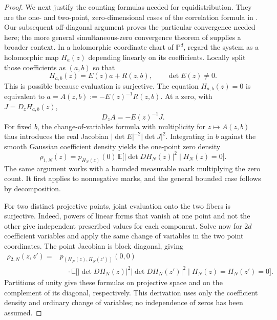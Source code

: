 \begin{proof}
We next justify the counting formulas needed for equidistribution.
They are the one- and two-point, zero-dimensional cases of the
correlation formula in \citet[Theorem~2.1]{BleherShiffmanZelditch2000}.
Our subsequent off-diagonal argument proves the particular convergence
needed here; the more general simultaneous-zero convergence theorem of
\citet[Corollary~1.3]{Shiffman2008Convergence} supplies a broader context.
In a holomorphic coordinate chart of $\mathbb P^d$, regard the system
as a holomorphic map $H_a(z)$ depending linearly on its coefficients.
Locally split those coefficients as $(a,b)$ so that
\[
 H_{a,b}(z)=E(z)a+R(z,b),\qquad \det E(z)\ne0.
\]
This is possible because evaluation is surjective.  The equation
$H_{a,b}(z)=0$ is equivalent to
$a=A(z,b):=-E(z)^{-1}R(z,b)$.  At a zero, with
$J=D_zH_{a,b}(z)$,
\[
 D_zA=-E(z)^{-1}J.
\]
For fixed $b$, the change-of-variables formula with multiplicity for
$z\mapsto A(z,b)$ thus introduces the real Jacobian
$|\det E|^{-2}|\det J|^2$.  Integrating in $b$ against the smooth
Gaussian coefficient density yields the one-point zero density
\begin{equation}
 \label{grid:one-point-density}
 \rho_{1,N}(z)=
 p_{H_N(z)}(0)\,
 \mathbb E\bigl[|\det DH_N(z)|^2\mid H_N(z)=0\bigr].
\end{equation}
The same argument works with a bounded measurable mark multiplying
the zero count.  It first applies to nonnegative marks, and the
general bounded case follows by decomposition.

For two distinct projective points, joint evaluation onto the two
fibers is surjective.  Indeed, powers of linear forms that vanish at
one point and not the other give independent prescribed values for
each component.  Solve now for $2d$ coefficient variables and apply
the same change of variables in the two point coordinates.  The
point Jacobian is block diagonal, giving
\begin{equation}
 \label{grid:two-point-density}
 \begin{split}
 \rho_{2,N}(z,z')={}&p_{(H_N(z),H_N(z'))}(0,0)\\
 &\quad\cdot
 \mathbb E\bigl[
   |\det DH_N(z)|^2|\det DH_N(z')|^2
       \mid H_N(z)=H_N(z')=0\bigr].
 \end{split}
\end{equation}
Partitions of unity give these formulas on projective space and on
the complement of its diagonal, respectively.  This derivation uses
only the coefficient density and ordinary change of variables; no
independence of zeros has been assumed.


\end{proof}
